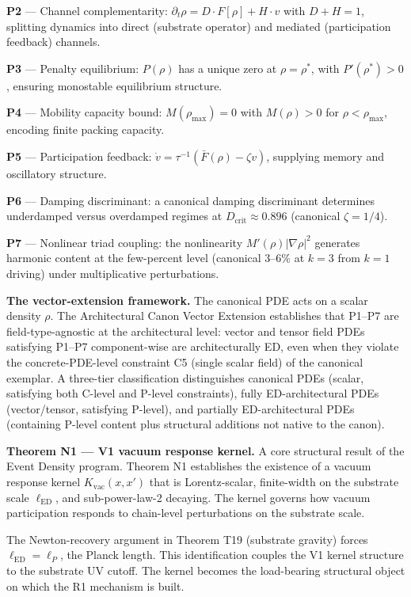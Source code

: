 \documentclass[11pt,a4paper]{article}
\begin{document}
\textbf{P2} --- Channel complementarity: $\partial_t\rho = D \cdot F[\rho] + H \cdot v$ with $D + H = 1$, splitting dynamics into direct (substrate operator) and mediated (participation feedback) channels.

\textbf{P3} --- Penalty equilibrium: $P(\rho)$ has a unique zero at $\rho = \rho^*$, with $P'(\rho^*) > 0$, ensuring monostable equilibrium structure.

\textbf{P4} --- Mobility capacity bound: $M(\rho_{\max}) = 0$ with $M(\rho) > 0$ for $\rho < \rho_{\max}$, encoding finite packing capacity.

\textbf{P5} --- Participation feedback: $\dot v = \tau^{-1}(\bar F(\rho) - \zeta v)$, supplying memory and oscillatory structure.

\textbf{P6} --- Damping discriminant: a canonical damping discriminant determines underdamped versus overdamped regimes at $D_{\mathrm{crit}} \approx 0.896$ (canonical $\zeta = 1/4$).

\textbf{P7} --- Nonlinear triad coupling: the nonlinearity $M'(\rho)|\nabla\rho|^2$ generates harmonic content at the few-percent level (canonical 3--6\% at $k = 3$ from $k = 1$ driving) under multiplicative perturbations.

\textbf{The vector-extension framework.} The canonical PDE acts on a scalar density $\rho$. The Architectural Canon Vector Extension establishes that P1--P7 are field-type-agnostic at the architectural level: vector and tensor field PDEs satisfying P1--P7 component-wise are architecturally ED, even when they violate the concrete-PDE-level constraint C5 (single scalar field) of the canonical exemplar. A three-tier classification distinguishes canonical PDEs (scalar, satisfying both C-level and P-level constraints), fully ED-architectural PDEs (vector/tensor, satisfying P-level), and partially ED-architectural PDEs (containing P-level content plus structural additions not native to the canon).

\textbf{Theorem N1 --- V1 vacuum response kernel.} A core structural result of the Event Density program. Theorem N1 establishes the existence of a vacuum response kernel $K_{\mathrm{vac}}(x, x')$ that is Lorentz-scalar, finite-width on the substrate scale $\ell_{\mathrm{ED}}$, and sub-power-law-2 decaying. The kernel governs how vacuum participation responds to chain-level perturbations on the substrate scale.

The Newton-recovery argument in Theorem T19 (substrate gravity) forces $\ell_{\mathrm{ED}} = \ell_P$, the Planck length. This identification couples the V1 kernel structure to the substrate UV cutoff. The kernel becomes the load-bearing structural object on which the R1 mechanism is built.
\end{document}
